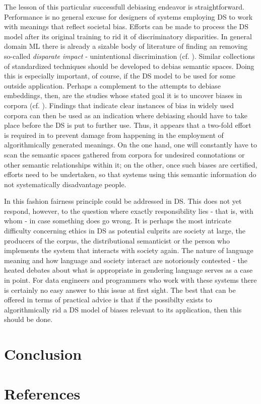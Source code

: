 \documentclass{article}
\begin{document}
The lesson of this particular successfull debiasing endeavor is straightforward. Performance is no general excuse for designers of systems employing DS to work with meanings that reflect societal bias. Efforts can be made to process the DS model after its original training to rid it of discriminatory disparities. In general domain ML there is already a sizable body of literature of finding an removing so-called \emph{disparate impact} - unintentional discrimination (cf. \cite{feldman2015certifying} \cite{dwork2012fairness}). 
Similar collections of standardized techniques should be developed to debias semantic spaces. Doing this is especially important, of course, if the DS model to be used for some outside application. 
Perhaps a complement to the attempts to debiase embeddings, then, are the studies whose stated goal it is to uncover biases in corpora (cf. \cite{wagner2015s} \cite{herbelot2012distributional}). Findings that indicate clear instances of bias in widely used corpora can then be used as an indication where  debiasing should have to take place before the DS is put to further use.
Thus, it appears that a two-fold effort is required in to prevent damage from happening in the employment of algorithmically generated meanings. On the one hand, one will constantly have to scan the semantic spaces gathered from corpora for undesired connotations or other semantic relationships within it; on the other, once such biases are certified, efforts need to be undertaken, so that systems using this semantic information do not systematically disadvantage people.

In this fashion fairness principle could be addressed in DS. This does not yet respond, however, to the question where exactly responsibility lies - that is, with whom - in case something does go wrong.
It is perhaps the most intricate difficulty concerning ethics in DS as potential culprits are society at large, the producers of the corpus, the distributional semanticist or the person who implements the system that interacts with society again. 
The nature of language meaning and how language and society interact are notoriously contested - the heated debates about what is appropriate in gendering language serves as a case in point. For data engineers and programmers who work with these systems there is certainly no easy answer to this issue at first sight.
The best that can be offered in terms of practical advice is that if the possibilty exists to algorithmically rid a DS model of biases relevant to its application, then this should be done.
\section{Conclusion}\hypertarget{sec5}{}

\section{References}\hypertarget{sec6}{ }
\printbibliography
\end{document}
